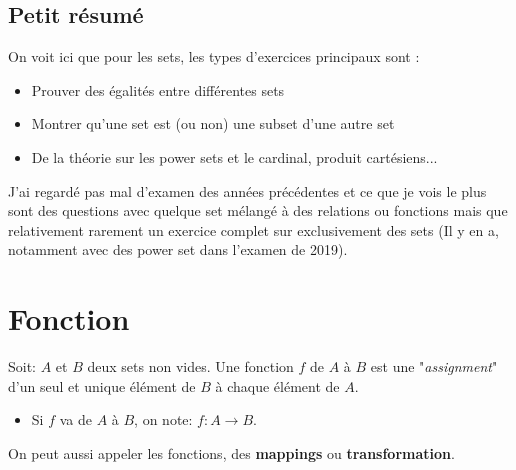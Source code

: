 \subsection{Petit résumé}
On voit ici que pour les sets, les types d'exercices principaux sont : 
\begin{itemize}
    \item Prouver des égalités entre différentes sets
    \item Montrer qu'une set est (ou non) une subset d'une autre set
    \item De la théorie sur les power sets et le cardinal, produit cartésiens...
\end{itemize}
J'ai regardé pas mal d'examen des années précédentes et ce que je vois le plus sont des questions avec quelque set mélangé à des relations ou fonctions mais que relativement rarement un exercice complet sur exclusivement des sets (Il y en a, notamment avec des power set dans l'examen de 2019). 


\section{Fonction}
\begin{definition}[fonction]
    Soit: $A$ et $B$ deux sets non vides. Une fonction $f$ de $A$ à $B$ est une "\textit{assignment}" d'un seul et unique élément de $B$ à chaque élément de $A$.
\end{definition}
\begin{itemize}
    \item Si $f$ va de $A$ à $B$, on note: $f: A \to B$.
\end{itemize}
On peut aussi appeler les fonctions, des \textbf{mappings} ou \textbf{transformation}.
\\
